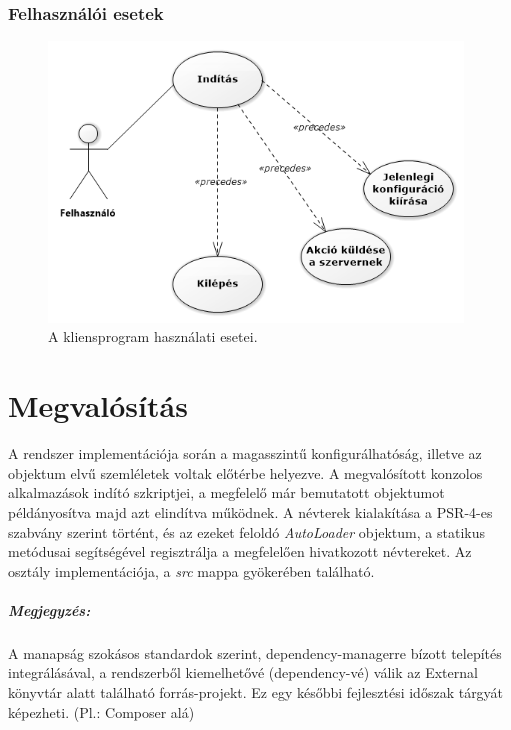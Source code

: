 \documentclass[12pt]{report}
\begin{document}
\subsubsection{Felhasználói esetek}
   \begin{figure}[ht]
       \centering
         \includegraphics[width=11cm]{pics/cluc.png}
	  \caption{A kliensprogram használati esetei.}
  \end{figure}
  

\section{Megvalósítás}
A rendszer implementációja során a magasszintű konfigurálhatóság, illetve az objektum elvű szemléletek voltak előtérbe helyezve. A megvalósított konzolos alkalmazások indító szkriptjei, a megfelelő már bemutatott objektumot példányosítva majd azt elindítva működnek. A névterek kialakítása a PSR-4-es szabvány szerint történt, és az ezeket feloldó \textit{AutoLoader} objektum, a statikus metódusai segítségével regisztrálja a megfelelően hivatkozott névtereket. Az osztály implementációja, a \textit{src} mappa gyökerében található.
\subparagraph{Megjegyzés:} A manapság szokásos standardok szerint, dependency-managerre bízott telepítés integrálásával, a rendszerből kiemelhetővé (dependency-vé) válik az External könyvtár alatt található forrás-projekt. Ez egy későbbi fejlesztési időszak tárgyát képezheti. (Pl.: Composer alá)
\end{document}
